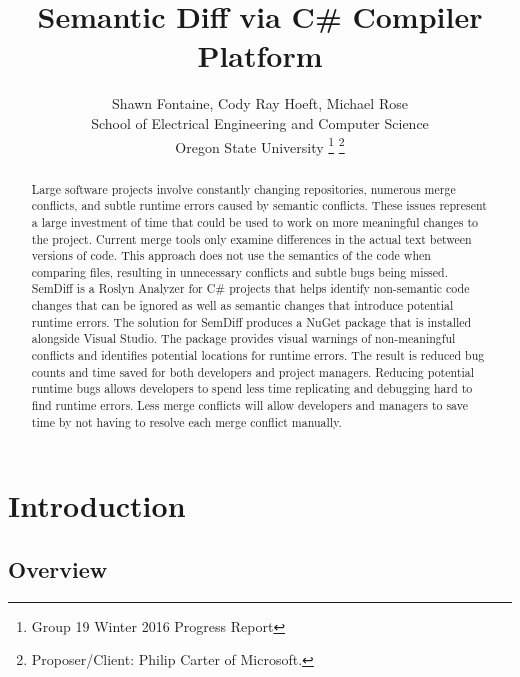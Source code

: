 \documentclass[draftclsnofoot,onecolumn]{IEEEtran}
\begin{document}
\lstset{style=cSharp}
\title{Semantic Diff via C\# Compiler Platform}

\author{Shawn Fontaine, Cody Ray Hoeft, Michael Rose\\
	School of Electrical Engineering and Computer Science\\
	Oregon State University
\thanks{Group 19 Winter 2016 Progress Report}
\thanks{Proposer/Client: Philip Carter of Microsoft.}}

\maketitle
{} %

\begin{abstract}

Large software projects involve constantly changing repositories, numerous 
merge conflicts, and subtle runtime errors caused by semantic conflicts. 
These issues represent a large investment of time that could be used to work
on more meaningful changes to the project. Current merge tools only examine 
differences in the actual text between versions of code. This approach does 
not use the semantics of the code when comparing files, resulting in 
unnecessary conflicts and subtle bugs being missed. SemDiff is a Roslyn 
Analyzer for C\# projects that helps identify non-semantic code changes that 
can be ignored as well as semantic changes that introduce potential runtime 
errors. The solution for SemDiff produces a NuGet package that is installed 
alongside Visual Studio. The package provides visual warnings of 
non-meaningful conflicts and identifies potential locations for runtime 
errors. The result is reduced bug counts and time saved for both developers 
and project managers. Reducing potential runtime bugs allows developers to 
spend less time replicating and debugging hard to find runtime errors. Less 
merge conflicts will allow developers and managers to save time by not having 
to resolve each merge conflict manually.

\end{abstract}

\newpage
\setcounter{tocdepth}{2}
\tableofcontents
\newpage
{}
\section{Introduction}
\subsection{Overview}
\end{document}
